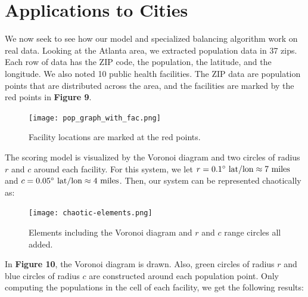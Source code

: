 \documentclass{article}
\begin{document}
\pagebreak

\section{Applications to Cities}
We now seek to see how our model and specialized balancing algorithm work on real data. Looking at the Atlanta area, we extracted population data in 37 zips. Each row of data has the ZIP code, the population, the latitude, and the longitude. We also noted 10 public health facilities. The ZIP data are population points that are distributed across the area, and the facilities are marked by the red points in \textbf{Figure 9}.

\begin{figure}[H]
    \centering
    \captionsetup{justification=centering,width=.9\linewidth}
    \captionsetup{justification=centering}
    \texttt{[image: pop\_graph\_with\_fac.png]}
    \caption{Facility locations are marked at the red points.}
    \label{fig:pop_points with facilities}
\end{figure}

The scoring model is visualized by the Voronoi diagram and two circles of radius $r$ and $c$ around each facility. For this system, we let $r = 0.1 \degree \ \textrm{lat/lon} \approx 7 \ \textrm{miles}$ and $c = 0.05 \degree \ \textrm{lat/lon} \approx 4 \ \textrm{miles}$. Then, our system can be represented chaotically as: 

\begin{figure}[H]
    \centering
    \captionsetup{justification=centering,width=.9\linewidth}
    \captionsetup{justification=centering}
    \texttt{[image: chaotic-elements.png]}
    \caption{Elements including the Voronoi diagram and $r$ and $c$ range circles all added.}
    \label{fig:final-interface}
\end{figure}

In \textbf{Figure 10}, the Voronoi diagram is drawn. Also, green circles of radius $r$ and blue circles of radius $c$ are constructed around each population point. Only computing the populations in the cell of each facility, we get the following results:
\end{document}
